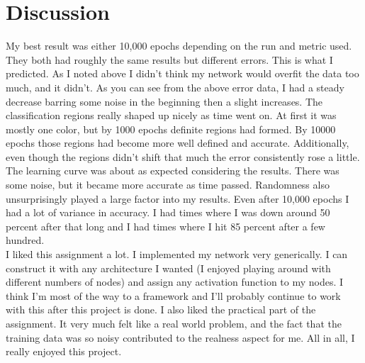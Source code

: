 \documentclass{book}
\begin{document}
\section*{Discussion}
\indent  My best result was either 10,000 epochs depending on the run and metric used. They both had roughly the same results but different errors.  This is what I predicted.  As I noted above I didn't think my network would overfit the data too much, and it didn't.  As you can see from the above error data, I had a steady decrease barring some noise in the beginning then a slight increases.  The classification regions really shaped up nicely as time went on.  At first it was mostly one color, but by 1000 epochs definite regions had formed.  By 10000 epochs those regions had become more well defined and accurate.  Additionally, even though the regions didn't shift that much the error consistently rose a little.  The learning curve was about as expected considering the results.  There was some noise, but it became more accurate as time passed.  Randomness also unsurprisingly played a large factor into my results.  Even after 10,000 epochs I had a lot of variance in accuracy.  I had times where I was down around 50 percent after that long and I had times where I hit 85 percent after a few hundred.  \\
\indent I liked this assignment a lot.  I implemented my network very generically.  I can construct it with any architecture I wanted (I enjoyed playing around with different numbers of nodes) and assign any activation function to my nodes.  I think I'm most of the way to a framework and I'll probably continue to work with this after this project is done.  I also liked the practical part of the assignment.  It very much felt like a real world problem, and the fact that the training data was so noisy contributed to the realness aspect for me.  All in all, I really enjoyed this project.  
\end{document}
